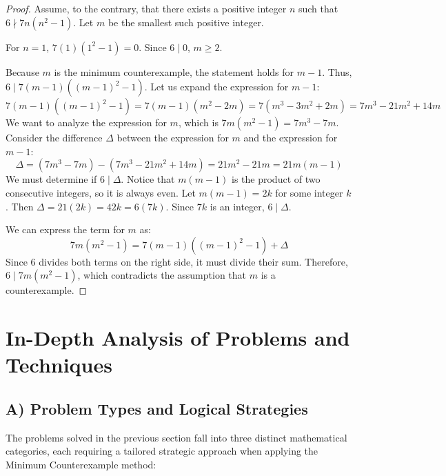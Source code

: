 \documentclass[11pt, a4paper]{article}
\theoremstyle{definition}
\theoremstyle{remark}
\begin{document}
\begin{proof}
Assume, to the contrary, that there exists a positive integer $n$ such that $6 \nmid 7n(n^2 - 1)$. Let $m$ be the smallest such positive integer.

For $n=1$, $7(1)(1^2 - 1) = 0$. Since $6 \mid 0$, $m \ge 2$.

Because $m$ is the minimum counterexample, the statement holds for $m-1$. Thus, $6 \mid 7(m-1)((m-1)^2 - 1)$.
Let us expand the expression for $m-1$:
\[
7(m-1)((m-1)^2 - 1) = 7(m-1)(m^2 - 2m) = 7(m^3 - 3m^2 + 2m) = 7m^3 - 21m^2 + 14m
\]
We want to analyze the expression for $m$, which is $7m(m^2 - 1) = 7m^3 - 7m$.
Consider the difference $\Delta$ between the expression for $m$ and the expression for $m-1$:
\[
\Delta = (7m^3 - 7m) - (7m^3 - 21m^2 + 14m) = 21m^2 - 21m = 21m(m-1)
\]
We must determine if $6 \mid \Delta$. Notice that $m(m-1)$ is the product of two consecutive integers, so it is always even. Let $m(m-1) = 2k$ for some integer $k$.
Then $\Delta = 21(2k) = 42k = 6(7k)$.
Since $7k$ is an integer, $6 \mid \Delta$.

We can express the term for $m$ as:
\[
7m(m^2 - 1) = 7(m-1)((m-1)^2 - 1) + \Delta
\]
Since $6$ divides both terms on the right side, it must divide their sum. Therefore, $6 \mid 7m(m^2 - 1)$, which contradicts the assumption that $m$ is a counterexample.
\end{proof}

\newpage
\section{In-Depth Analysis of Problems and Techniques}

\subsection{A) Problem Types and Logical Strategies}
The problems solved in the previous section fall into three distinct mathematical categories, each requiring a tailored strategic approach when applying the Minimum Counterexample method:
\end{document}
